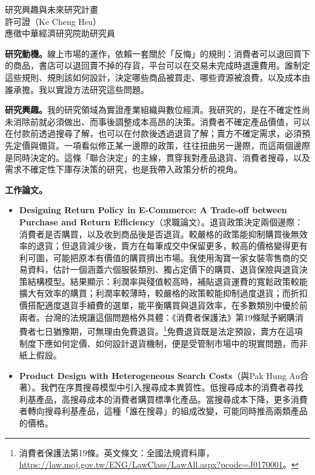 \documentclass[11pt,letterpaper]{article}
\begin{document}
\begin{center}
{\Large 研究興趣與未來研究計畫}\\[0.25em]
許可證（Ke Cheng Hsu）\\[0.15em]
{\small 應徵中華經濟研究院助研究員}
\end{center}

\noindent\textbf{研究動機。}線上市場的運作，依賴一套關於「反悔」的規則：消費者可以退回買下的商品，書店可以退回賣不掉的存貨，平台可以在交易未完成時退還費用。誰制定這些規則、規則該如何設計，決定哪些商品被買走、哪些資源被浪費，以及成本由誰承擔。我以實證方法研究這些問題。

\medskip
\noindent\textbf{研究興趣。}我的研究領域為實證產業組織與數位經濟。我研究的，是在不確定性尚未消除前就必須做出、而事後調整成本高昂的決策。消費者不確定產品價值，可以在付款前透過搜尋了解，也可以在付款後透過退貨了解；賣方不確定需求，必須預先定價與備貨。一項看似修正某一邊際的政策，往往扭曲另一邊際，而這兩個邊際是同時決定的。這條「聯合決定」的主線，貫穿我對產品退貨、消費者搜尋，以及需求不確定性下庫存決策的研究，也是我帶入政策分析的視角。

\medskip
\noindent\textbf{工作論文。}
\begin{itemize}[leftmargin=1.6em,itemsep=0.2em,topsep=0.1em,parsep=0.1em]
\item \textbf{Designing Return Policy in E-Commerce: A Trade-off between Purchase and Return Efficiency}（求職論文）。退貨政策決定兩個邊際：消費者是否購買，以及收到商品後是否退貨。較嚴格的政策能抑制購買後無效率的退貨；但退貨減少後，賣方在每筆成交中保留更多，較高的價格變得更有利可圖，可能把原本有價值的購買擠出市場。我使用淘寶一家女裝零售商的交易資料，估計一個涵蓋六個服裝類別、獨占定價下的購買、退貨保險與退貨決策結構模型。結果顯示：利潤率與殘值較高時，補貼退貨運費的寬鬆政策較能擴大有效率的購買；利潤率較薄時，較嚴格的政策較能抑制過度退貨；而折扣價搭配適度退貨手續費的選單，能平衡購買與退貨效率，在多數類別中優於前兩者。台灣的法規讓這個問題格外具體：《消費者保護法》第19條賦予網購消費者七日猶豫期，可無理由免費退貨。\footnote{消費者保護法第19條。英文條文：全國法規資料庫，\url{https://law.moj.gov.tw/ENG/LawClass/LawAll.aspx?pcode=J0170001}。}免費退貨既是法定預設，賣方在這項制度下應如何定價、如何設計退貨機制，便是受管制市場中的現實問題，而非紙上假設。
\item \textbf{Product Design with Heterogeneous Search Costs}（與Pak Hung Au合著）。我們在序貫搜尋模型中引入搜尋成本異質性。低搜尋成本的消費者尋找利基產品，高搜尋成本的消費者購買標準化產品。當搜尋成本下降，更多消費者轉向搜尋利基產品，這種「誰在搜尋」的組成改變，可能同時推高兩類產品的價格。
\end{itemize}
\end{document}
